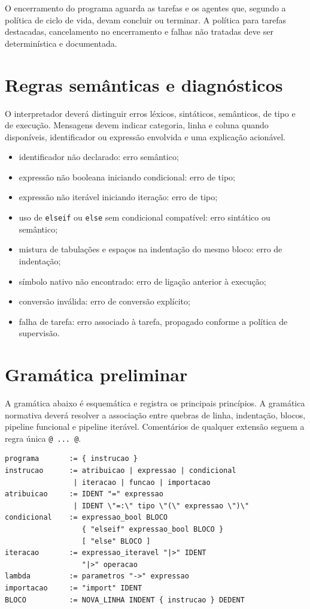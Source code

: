 \documentclass[12pt,a4paper]{article}
\begin{document}
O encerramento do programa aguarda as tarefas e os agentes que, segundo a política de ciclo de vida, devam concluir ou terminar. A política para tarefas destacadas, cancelamento no encerramento e falhas não tratadas deve ser determinística e documentada.

\section{Regras semânticas e diagnósticos}
O interpretador deverá distinguir erros léxicos, sintáticos, semânticos, de tipo e de execução. Mensagens devem indicar categoria, linha e coluna quando disponíveis, identificador ou expressão envolvida e uma explicação acionável.

\begin{itemize}
\item identificador não declarado: erro semântico;
\item expressão não booleana iniciando condicional: erro de tipo;
\item expressão não iterável iniciando iteração: erro de tipo;
\item uso de \texttt{elseif} ou \texttt{else} sem condicional compatível: erro sintático ou semântico;
\item mistura de tabulações e espaços na indentação do mesmo bloco: erro de indentação;
\item símbolo nativo não encontrado: erro de ligação anterior à execução;
\item conversão inválida: erro de conversão explícito;
\item falha de tarefa: erro associado à tarefa, propagado conforme a política de supervisão.
\end{itemize}

\section{Gramática preliminar}
A gramática abaixo é esquemática e registra os principais princípios. A gramática normativa deverá resolver a associação entre quebras de linha, indentação, blocos, pipeline funcional e pipeline iterável. Comentários de qualquer extensão seguem a regra única \texttt{@ ... @}.

\begin{lstlisting}
programa       := { instrucao }
instrucao      := atribuicao | expressao | condicional
                | iteracao | funcao | importacao
atribuicao     := IDENT "=" expressao
                | IDENT \"=:\" tipo \"(\" expressao \")\"
condicional    := expressao_bool BLOCO
                  { "elseif" expressao_bool BLOCO }
                  [ "else" BLOCO ]
iteracao       := expressao_iteravel "|>" IDENT
                  "|>" operacao
lambda         := parametros "->" expressao
importacao     := "import" IDENT
BLOCO          := NOVA_LINHA INDENT { instrucao } DEDENT
\end{lstlisting}
\end{document}
